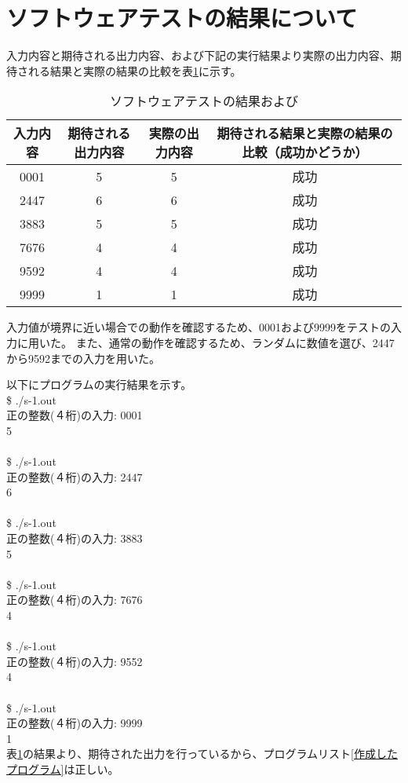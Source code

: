 

\section{ソフトウェアテストの結果について}
入力内容と期待される出力内容、および下記の実行結果より実際の出力内容、期待される結果と実際の結果の比較を表\ref{入力内容と期待される出力内容}に示す。

\begin{table}[H]
    \centering
    \caption{ソフトウェアテストの結果および}
    \label{入力内容と期待される出力内容}
        \begin{tabular}{|c|c|c|c|} \hline
            入力内容 & 期待される出力内容 & 実際の出力内容 & 期待される結果と実際の結果の比較（成功かどうか） \\ \hline
            0001 & 5 & 5 & 成功 \\
            2447 & 6 & 6 & 成功 \\
            3883 & 5 & 5 & 成功 \\
            7676 & 4 & 4 & 成功 \\
            9592 & 4 & 4 & 成功 \\
            9999 & 1 & 1 & 成功 \\ \hline
        \end{tabular}
\end{table}
入力値が境界に近い場合での動作を確認するため、0001および9999をテストの入力に用いた。
また、通常の動作を確認するため、ランダムに数値を選び、2447から9592までの入力を用いた。

以下にプログラムの実行結果を示す。 \\
%
\$ ./s-1.out \\
正の整数(４桁)の入力: 0001 \\
5 \\
\\
\$ ./s-1.out \\
正の整数(４桁)の入力: 2447 \\
6 \\
\\
\$ ./s-1.out \\
正の整数(４桁)の入力: 3883 \\
5 \\
\\
\$ ./s-1.out \\
正の整数(４桁)の入力: 7676 \\
4 \\
\\
\$ ./s-1.out \\ 
正の整数(４桁)の入力: 9552 \\ 
4 \\
\\
\$ ./s-1.out \\
正の整数(４桁)の入力: 9999 \\
1 \\

表\ref{入力内容と期待される出力内容}の結果より、期待された出力を行っているから、プログラムリスト\ref{作成したプログラム}は正しい。


